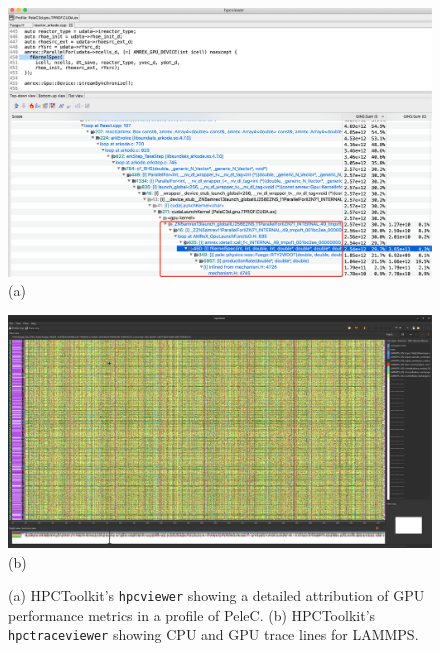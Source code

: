 \begin{figure}[t]
\captionsetup{width=.96\textwidth}
\begin{minipage}[t]{.40\textwidth}
\centering
\includegraphics[width=\textwidth]{projects/2.3.2-Tools/2.3.2.08-HPCToolkit/hpctoolkit-pelec-profiles}
\\(a)
\end{minipage}
\hfill
\begin{minipage}[t]{.46\textwidth}
\centering
\includegraphics[width=\textwidth]{projects/2.3.2-Tools/2.3.2.08-HPCToolkit/hpctoolkit-lammps-traces}
\\(b)
\end{minipage}
\caption{(a) 
HPCToolkit's {\tt hpcviewer} showing a detailed attribution of GPU performance metrics in a 
profile of PeleC.
(b) HPCToolkit's {\tt hpctraceviewer} showing CPU and GPU trace lines for LAMMPS.}
\label{fig:hpctoolkit}
\end{figure}

